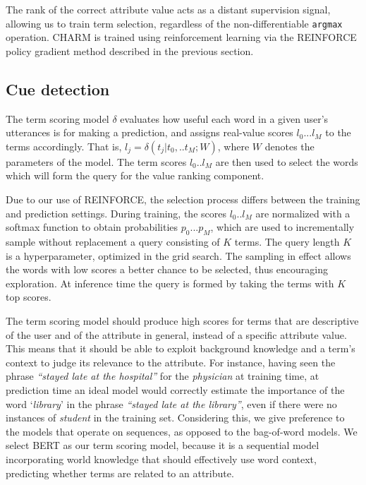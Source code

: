 The rank of the correct attribute value acts as a distant supervision signal, allowing us to train term selection, regardless of the non-differentiable \texttt{argmax} operation.
CHARM is trained using reinforcement learning via the REINFORCE policy gradient method described in the previous section.


\subsection{Cue detection}
\label{sec:term-selection}

The  term scoring model $\delta$ evaluates how useful
each word in a given user's utterances is for making a prediction,
and assigns real-value scores $l_0 ... l_M$ to the terms accordingly. 
That is,
    $l_j = \delta (t_j | t_0, .. t_M; W)$,
where $W$ denotes the parameters of the model. The term scores $l_0 .. l_M$ are then used to select the words which will form the query for the value ranking component. 

Due to our use of REINFORCE, the selection process differs between the training and prediction settings.
During training, the scores $l_0 .. l_M$ are normalized with a softmax function to obtain
probabilities $p_0 ... p_M$, which are used to incrementally sample without replacement a query consisting of $K$ terms. The query length $K$ is a hyperparameter, optimized in the grid search.
The sampling in effect allows the words with low scores a better chance to be selected,
thus encouraging exploration. At inference time the query is formed by taking the terms with $K$ top scores.

The term scoring model 
should produce high scores for terms that are descriptive of the user and of the attribute in general, instead of a specific attribute value. This means that it should be able to exploit background knowledge and a term's context to 
judge its relevance to the attribute.
For instance, having seen the phrase \emph{``stayed late at the hospital''} for the 
\emph{physician} at training time, at prediction time an ideal model would correctly estimate the importance of the word `\textit{library}' in the phrase \emph{``stayed late at the library''}, even if there were no instances of \emph{student} in the training set. Considering this, we give preference to the models that operate on sequences, as opposed to the bag-of-word models. We select BERT \cite{devlin2018bert} as our term scoring model, because it is a sequential model incorporating world knowledge that should effectively use word context, predicting whether terms are related to an attribute.

